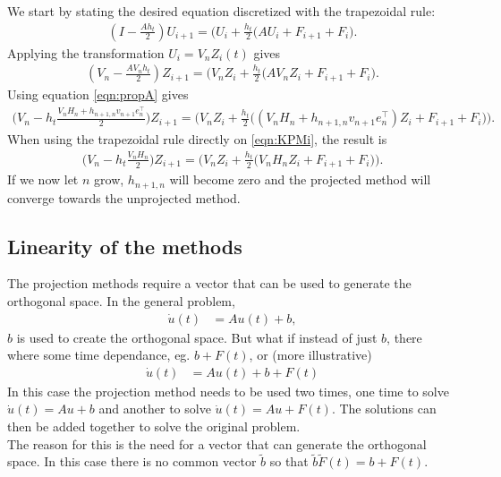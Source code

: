 We start by stating the desired equation discretized with the trapezoidal rule:
\begin{equation*}
\begin{aligned}
(I-\frac{Ah_t}{2}) U_{i+1} = \Big( U_i + \frac{h_t}{2} \big( A U_i + F_{i+1} +F_{i} \big).
\end{aligned}
\end{equation*}
Applying the transformation $ U_i = V_n Z_i(t) $ gives
\begin{equation*}
\begin{aligned}
(V_n-\frac{A V_n h_t}{2}) Z_{i+1} = \Big( V_n Z_i + \frac{h_t}{2} \big( A V_n Z_i + F_{i+1} +F_{i} \big).
\end{aligned}
\end{equation*}
Using equation \eqref{eqn:propA} gives
\begin{equation*}
\begin{aligned}
\Big(V_n-h_t\frac{V_n H_n + h_{n+1,n}v_{n+1} e_n^\top }{2}\Big) Z_{i+1} = \Big( V_n Z_i + \frac{h_t}{2} \big( (V_n H_n + h_{n+1,n}v_{n+1} e_n^\top) Z_i + F_{i+1} +F_{i} \big) \Big).
\end{aligned}
\end{equation*}
When using the trapezoidal rule directly on \eqref{eqn:KPMi}, the result is
\begin{equation*}
\begin{aligned}
\Big(V_n-h_t\frac{V_n H_n}{2}\Big) Z_{i+1} = \Big( V_n Z_i + \frac{h_t}{2} \big( V_n H_n Z_i + F_{i+1} +F_{i} \big) \Big).
\end{aligned}
\end{equation*}
If we now let $n$ grow, $h_{n+1,n}$ will become zero and the projected method will converge towards the unprojected method. 
\subsection{Linearity of the methods} %
The projection methods require a vector that can be used to generate the orthogonal space. In the general problem,
\begin{equation*}
\begin{aligned}
\dot{u}(t) &= Au(t) + b,
\end{aligned}
\end{equation*} 
$b$ is used to create the orthogonal space. But what if instead of just $b$, there where some time dependance, eg. $b + F(t)$, or (more illustrative)
\begin{equation*}
\begin{aligned}
\dot{u}(t) &= Au(t) + b + F(t)
\end{aligned}
\end{equation*} 
In this case the projection method needs to be used two times, one time to solve $ \dot{u}(t) = Au + b $ and another to solve $ \dot{u}(t) = Au + F(t) $. The solutions can then be added together to solve the original problem. \\
The reason for this is the need for a vector that can generate the orthogonal space. In this case there is no common vector $\tilde{b}$ so that $\tilde{b} \tilde{F}(t) = b + F(t)$. \\


